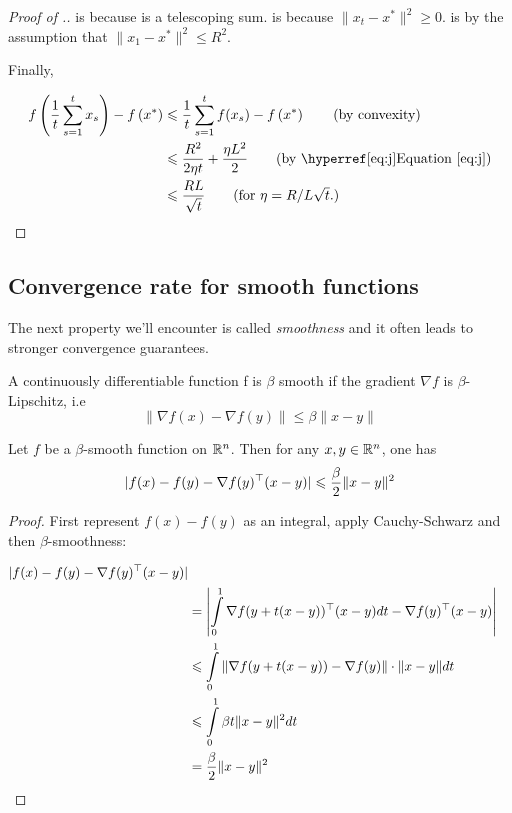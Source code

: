\begin{proof}[Proof of .]
 is because  is a telescoping sum.
 is because $\lVert x_{t} - x^* \rVert^2 \geq 0$.
 is by the assumption that $\lVert x_1 - x^* \rVert^2 \leq R^2$.

Finally,

\begin{align*}
    f\left(\frac{1}{t}\sum_{s=1}^t x_s\right) - f\left(x^*\right)
&\leq \frac{1}{t} \sum_{s=1}^t f(x_s) - f\left(x^*\right) \tag{by convexity} \\
&\leq \frac{R^2}{2\eta t} + \frac{\eta L^2}{2} \tag{by \equationref{j}}\\
&\leq \frac{RL}{\sqrt{t}} \tag{for $\eta=R/L\sqrt{t}.$}
\end{align*}

\end{proof}

\subsection{Convergence rate for smooth functions}

The next property we'll encounter is called \emph{smoothness} and it often leads
to stronger convergence guarantees.

\begin{definition}
A continuously differentiable function f is $\beta$ smooth if the gradient $\nabla f$ is $\beta$-Lipschitz, i.e
$$\|\nabla f(x) - \nabla f(y)\| \leq \beta\|x-y\|$$
\end{definition}


\begin{lemma}\label{l1}
Let $f$ be a $\beta$-smooth function on $\mathbb{R}^n$.  Then for any $x,y \in \mathbb{R}^n$, one has
$$|f(x) - f(y) - \nabla f(y)^\top(x-y)| \leqslant \frac{\beta}{2}\|x-y\|^2$$
\end{lemma}

\begin{proof}
First represent $f(x) - f(y)$ as an integral, apply Cauchy-Schwarz and then $\beta$-smoothness:

\begin{align*}
|f(x) - f(y) - \nabla f(y)^\top(x-y)|\\
&=\left|\int\limits_{0}^1 \nabla f(y + t(x-y))^\top(x-y)dt - \nabla
f(y)^\top(x-y)\right|\\
&\leqslant  \int\limits_{0}^1 \|\nabla f(y + t(x-y)) - \nabla f(y)\|\cdot \|x-y\|dt\\
&\leqslant \int\limits_{0}^1 \beta t\|x-y\|^2dt\\
&= \frac{\beta}{2}\|x-y\|^2\\
\end{align*}
\end{proof}

